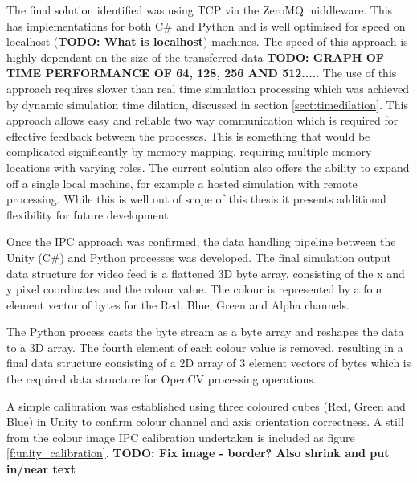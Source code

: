 \documentclass[]{aiaa-tc}%
\begin{document}
The final solution identified was using TCP via the ZeroMQ middleware. This has implementations for both C\# and Python and is well optimised for speed on localhost (\textbf{TODO: What is localhost}) machines. The speed of this approach is highly dependant on the size of the transferred data \textbf{TODO: GRAPH OF TIME PERFORMANCE OF 64, 128, 256 AND 512....}. The use of this approach requires slower than real time simulation processing which was achieved by dynamic simulation time dilation, discussed in section \ref{sect:timedilation}. This approach allows easy and reliable two way communication which is required for effective feedback between the processes. This is something that would be complicated significantly by memory mapping, requiring multiple memory locations with varying roles. The current solution also offers the ability to expand off a single local machine, for example a hosted simulation with remote processing. While this is well out of scope of this thesis it presents additional flexibility for future development.

Once the IPC approach was confirmed, the data handling pipeline between the Unity (C\#) and Python processes was developed. The final simulation output data structure for video feed is a flattened 3D byte array, consisting of the x and y pixel coordinates and the colour value. The colour is represented by a four element vector of bytes for the Red, Blue, Green and Alpha channels. 

The Python process casts the byte stream as a byte array and reshapes the data to a 3D array. The fourth element of each colour value is removed, resulting in a final data structure consisting of a 2D array of 3 element vectors of bytes which is the required data structure for OpenCV processing operations. 

A simple calibration was established using three coloured cubes (Red, Green and Blue) in Unity to confirm colour channel and axis orientation correctness. A still from the colour image IPC calibration undertaken is included as figure \ref{f:unity_calibration}. \textbf{TODO: Fix image - border? Also shrink and put in/near text}
\end{document}
